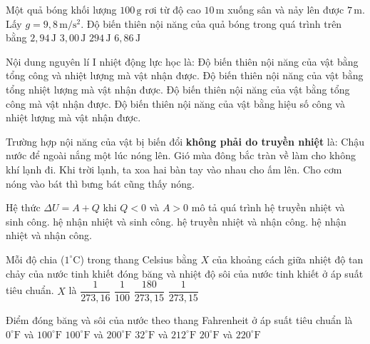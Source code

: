 \begin{ex}
	Một quả bóng khối lượng $100\,\mathrm{g}$ rơi từ độ cao $10\,\mathrm{m}$ xuống sân và nảy lên được $7\,\mathrm{m}$. Lấy $g=9{,}8\,\mathrm{m/s^2}$. Độ biến thiên nội năng của quả bóng trong quá trình trên bằng
	\choice
	{\True $2{,}94\,\mathrm{J}$}
	{$3{,}00\,\mathrm{J}$}
	{$294\,\mathrm{J}$}
	{$6{,}86\,\mathrm{J}$}
\end{ex}


\begin{ex}
	Nội dung nguyên lí I nhiệt động lực học là:
	\choice
	{\True Độ biến thiên nội năng của vật bằng tổng công và nhiệt lượng mà vật nhận được.}
	{Độ biến thiên nội năng của vật bằng tổng nhiệt lượng mà vật nhận được.}
	{Độ biến thiên nội năng của vật bằng tổng công mà vật nhận được.}
	{Độ biến thiên nội năng của vật bằng hiệu số công và nhiệt lượng mà vật nhận được.}
\end{ex}
\begin{ex}
	Trường hợp nội năng của vật bị biến đổi \textbf{không phải do truyền nhiệt} là:
	\choice
	{Chậu nước để ngoài nắng một lúc nóng lên.}
	{Gió mùa đông bắc tràn về làm cho không khí lạnh đi.}
	{\True Khi trời lạnh, ta xoa hai bàn tay vào nhau cho ấm lên.}
	{Cho cơm nóng vào bát thì bưng bát cũng thấy nóng.}
\end{ex}

\begin{ex}
	Hệ thức $\Delta U=A+Q$ khi $Q<0$ và $A>0$ mô tả quá trình
	\choice
	{hệ truyền nhiệt và sinh công.}
	{hệ nhận nhiệt và sinh công.}
	{\True hệ truyền nhiệt và nhận công.}
	{hệ nhận nhiệt và nhận công.}
\end{ex}
\begin{ex}
	Mỗi độ chia ($1^\circ\mathrm{C}$) trong thang Celsius bằng $X$ của khoảng cách giữa nhiệt độ tan chảy của nước tinh khiết đóng băng và nhiệt độ sôi của nước tinh khiết ở áp suất tiêu chuẩn. $X$ là
	\choice
	{$\dfrac{1}{273{,}16}$}
	{\True $\dfrac{1}{100}$}
	{$\dfrac{180}{273{,}15}$}
	{$\dfrac{1}{273{,}15}$}
\end{ex}
\begin{ex}
	Điểm đóng băng và sôi của nước theo thang Fahrenheit ở áp suất tiêu chuẩn là
	\choice
	{$0^\circ\mathrm{F}$ và $100^\circ\mathrm{F}$}
	{$100^\circ\mathrm{F}$ và $200^\circ\mathrm{F}$}
	{\True $32^\circ\mathrm{F}$ và $212^\circ\mathrm{F}$}
	{$20^\circ\mathrm{F}$ và $220^\circ\mathrm{F}$}
\end{ex}


